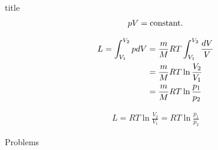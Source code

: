 \documentclass[dvipdfmx, 10pt, aspectratio = 169]{beamer}
\begin{document}
\begin{frame}{title}
	\begin{align*}
		pV = {\rm constant.}
	\end{align*}
	
	\begin{align}
		L = \int^{V_2}_{V_1} pdV &= \frac{m}{M} RT \int^{V_2}_{V_1} \frac{dV}{V} \notag \\
		&= \frac{m}{M}RT \ln \frac{V_2}{V_1} \notag \\
		&= \frac{m}{M} RT \ln \frac{p_1}{p_2}
	\end{align}
	
	\begin{align}
		L = RT \ln \frac{V_2}{V_1} = RT \ln \frac{p_1}{p_2}
	\end{align}
\end{frame}

\begin{frame}{Problems}
\end{frame}
\end{document}

